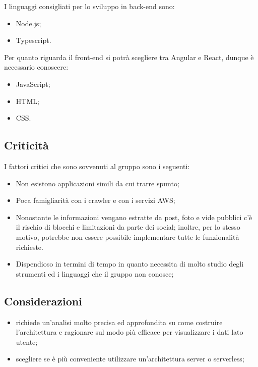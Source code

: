 \documentclass[12pt,a4paper]{article}
\begin{document}
		I linguaggi consigliati per lo sviluppo in back-end sono:
		\begin{itemize}
			\item Node.js;
			\item Typescript.
		\end{itemize}
		Per quanto riguarda il front-end si potrà scegliere tra Angular e React, dunque è necessario conoscere:
		\begin{itemize}
			\item JavaScript;
			\item HTML;
			\item CSS.
		\end{itemize}

	\subsection{Criticità}
	I fattori critici che sono sovvenuti al gruppo sono i seguenti:
		\begin{itemize}
			\item Non esistono applicazioni simili da cui trarre spunto;
			\item Poca famigliarità con i crawler e con i servizi AWS;
			\item Nonostante le informazioni vengano estratte da post, foto e vide pubblici c'è il rischio di blocchi e limitazioni da parte dei social; inoltre, per lo stesso motivo, potrebbe non essere possibile implementare tutte le funzionalità richieste.
			\item Dispendioso in termini di tempo in quanto necessita di molto studio degli strumenti ed i linguaggi che il gruppo non conosce;
		\end{itemize}

	\subsection{Considerazioni}
	\begin{itemize}
		\item richiede un'analisi molto precisa ed approfondita su come costruire l'architettura e ragionare sul modo più efficace per visualizzare i dati lato utente;
		\item scegliere se è più conveniente utilizzare un'architettura server o serverless;
	\end{itemize}
\end{document}
